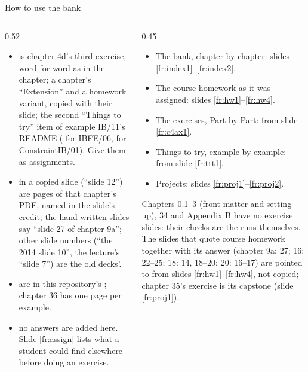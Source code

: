 \documentclass[aspectratio=169,11pt]{beamer}
\begin{document}
\begin{frame}{How to use the bank}
\label{fr:use}
\begin{columns}[T,onlytextwidth]
\begin{column}{0.52\textwidth}
\footnotesize
\begin{itemize}\setlength{\itemsep}{3pt}
  \item {}  is chapter 4d's third exercise, word for word as in the chapter;  a chapter's ``Extension'' and  a homework variant, copied with their slide;  the second ``Things to try'' item of example IB/11's README ( for IBFE/06,  for ConstraintIB/01). Give them as assignments.
  \item {} in a copied slide (``slide 12'') are pages of that chapter's PDF, named in the slide's credit; the hand-written slides say ``slide 27 of chapter 9a''; other slide numbers (``the 2014 slide 10'', the lecture's ``slide 7'') are the old decks'.
  \item {} are in this repository's ; chapter 36 has one page per example.
  \item {} no answers are added here. Slide \ref{fr:assign} lists what a student could find elsewhere before doing an exercise.
\end{itemize}
\end{column}
\begin{column}{0.45\textwidth}
\footnotesize
\begin{itemize}\setlength{\itemsep}{3pt}
  \item The bank, chapter by chapter: slides \ref{fr:index1}--\ref{fr:index2}.
  \item The course homework as it was assigned: slides \ref{fr:hw1}--\ref{fr:hw4}.
  \item The exercises, Part by Part: from slide \ref{fr:c4ax1}.
  \item Things to try, example by example: from slide \ref{fr:ttt1}.
  \item Projects: slides \ref{fr:proj1}--\ref{fr:proj2}.
\end{itemize}
\begin{punchbox}
\scriptsize Chapters 0.1--3 (front matter and setting up), 34 and Appendix B have no exercise slides: their checks are the runs themselves. The slides that quote course homework together with its answer (chapter 9a: 27; 16: 22--25; 18: 14, 18--20; 20: 16--17) are pointed to from slides \ref{fr:hw1}--\ref{fr:hw4}, not copied; chapter 35's exercise is its capstone (slide \ref{fr:proj1}).
\end{punchbox}
\end{column}
\end{columns}
\end{frame}
\end{document}
